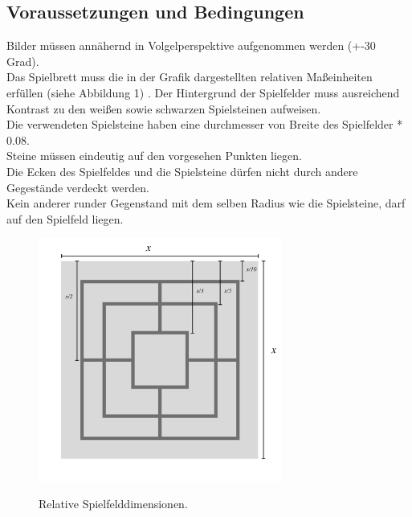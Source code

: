 \documentclass[paper=A4, deutsch]{scrartcl}
\begin{document}
\subsection{Voraussetzungen und Bedingungen}
Bilder müssen annähernd in Volgelperspektive aufgenommen werden (+-30 Grad). \\
Das Spielbrett muss die in der Grafik dargestellten relativen Maßeinheiten erfüllen (siehe Abbildung 1) . 
Der Hintergrund der Spielfelder muss ausreichend Kontrast zu den weißen sowie schwarzen Spielsteinen aufweisen. \\
Die verwendeten Spielsteine haben eine durchmesser von Breite des Spielfelder * 0.08.\\
Steine müssen eindeutig auf den vorgesehen Punkten liegen.\\
Die Ecken des Spielfeldes und die Spielsteine dürfen nicht durch andere Gegestände verdeckt werden.\\
Kein anderer runder Gegenstand mit dem selben Radius wie die Spielsteine, darf auf den Spielfeld liegen. 
\begin{figure}[ht]
	\centering
		\includegraphics[width=8cm]{Spielbrett_relativeDimensionen_grafik.jpg}\\
	\caption[Relative Spielfelddimensionen]{Relative Spielfelddimensionen.}
	\label{fig:nettop}
\end{figure}
\end{document}
